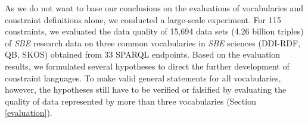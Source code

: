 \documentclass[conference]{IEEEtran}
\begin{document}
As we do not want to base our conclusions on the evaluations of vocabularies and constraint definitions alone, we conducted a large-scale experiment.
For 115 constraints, we evaluated the data quality of 15,694 data sets (4.26 billion triples) of \emph{SBE} research data on three common vocabularies in \emph{SBE} sciences (DDI-RDF, QB, SKOS) obtained from 33 SPARQL endpoints.
Based on the evaluation results,
we formulated several hypotheses to direct the further development of constraint languages.
To make valid general statements for all vocabularies, however,
the hypotheses still have to be verified or falsified
by evaluating the quality of data represented by more than three vocabularies (Section \ref{evaluation}).
\end{document}
